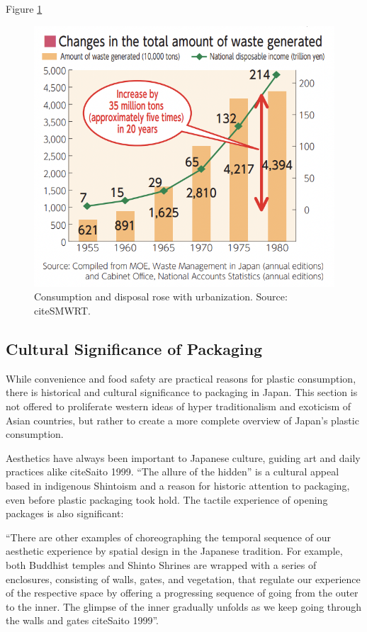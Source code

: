 \documentclass{book}\usepackage{knitr}
\begin{document}
Figure \ref{fig:wealthwaste}

\begin{figure}[h]
\includegraphics[width=\linewidth]{images/JapanPlastics/wealthwaste.png}
\caption{Consumption and disposal rose with urbanization. Source: citeSMWRT.}
\label{fig:wealthwaste}
\end{figure}
	
\subsection{Cultural Significance of Packaging} 

While convenience and food safety are practical reasons for plastic consumption, there is historical and cultural significance to packaging in Japan. This section is not offered to proliferate western ideas of hyper traditionalism and exoticism of Asian countries, but rather to create a more complete overview of Japan's plastic consumption. 

Aesthetics have always been important to Japanese culture, guiding art and daily practices alike citeSaito 1999. ``The allure of the hidden'' is a cultural appeal based in indigenous Shintoism and a reason for historic attention to packaging, even before plastic packaging took hold. The tactile experience of opening packages is also significant:

``There are other examples of choreographing the temporal sequence of our aesthetic experience by spatial design in the Japanese tradition. For example, both Buddhist temples and Shinto Shrines are wrapped with a series of enclosures, consisting of walls, gates, and vegetation, that regulate our experience of the respective space by offering a progressing sequence of going from the outer to the inner. The glimpse of the inner gradually unfolds as we keep going through the walls and gates citeSaito 1999''.
\end{document}
